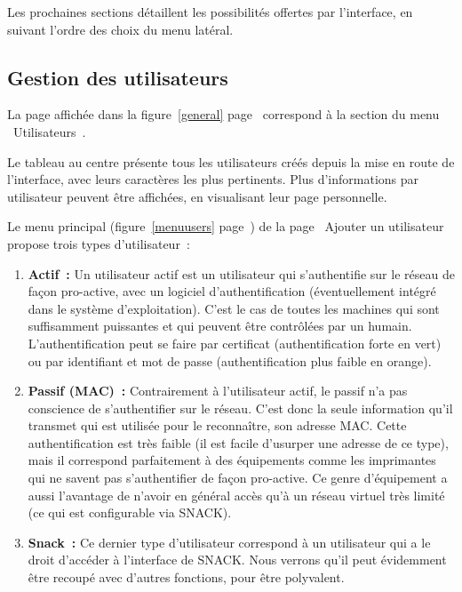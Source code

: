 Les prochaines sections détaillent les possibilités offertes par l'interface, en suivant l'ordre des choix du menu latéral.

\subsection{Gestion des utilisateurs}

La page affichée dans la figure~\ref{general} page~\pageref{general} correspond à la section du menu \og~Utilisateurs~\fg.

Le tableau au centre présente tous les utilisateurs créés depuis la mise en route de l'interface, avec leurs caractères les plus pertinents. Plus d'informations par utilisateur peuvent être affichées, en visualisant leur page personnelle.

Le menu principal (figure~\ref{menuusers} page~\pageref{menuusers}) de la page \og~Ajouter un utilisateur~\fg{} propose trois types d'utilisateur~:

\begin{enumerate}
\item \textbf{Actif~:} Un utilisateur actif est un utilisateur qui s'authentifie sur le réseau de façon pro-active, avec un logiciel d'authentification (éventuellement intégré dans le système d'exploitation). C'est le cas de toutes les machines qui sont suffisamment puissantes et qui peuvent être contrôlées par un humain. L'authentification peut se faire par certificat (authentification forte en vert) ou par identifiant et mot de passe (authentification plus faible en orange).
\item \textbf{Passif (MAC)~:} Contrairement à l'utilisateur actif, le passif n'a pas conscience de s'authentifier sur le réseau. C'est donc la seule information qu'il transmet qui est utilisée pour le reconnaître, son adresse MAC. Cette authentification est très faible (il est facile d'usurper une adresse de ce type), mais il correspond parfaitement à des équipements comme les imprimantes qui ne savent pas s'authentifier de façon pro-active. Ce genre d'équipement a aussi l'avantage de n'avoir en général accès qu'à un réseau virtuel très limité (ce qui est configurable via SNACK).
\item \textbf{Snack~:} Ce dernier type d'utilisateur correspond à un utilisateur qui a le droit d'accéder à l'interface de SNACK. Nous verrons qu'il peut évidemment être recoupé avec d'autres fonctions, pour être polyvalent.
\end{enumerate}


